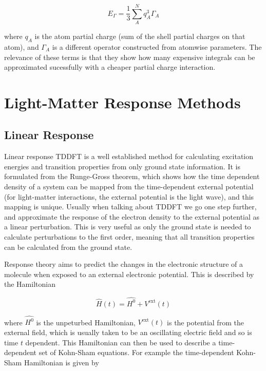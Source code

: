 \begin{equation}
E_\Gamma = \frac{1}{3}\sum_A^N q_A^3 \Gamma_A
\end{equation}

where $q_A$ is the atom partial charge (sum of the shell partial charges on that atom), 
and $\Gamma_A$ is a different operator constructed from atomwise parameters. The relevance 
of these terms is that they show how many expensive integrals can be approximated 
sucessfully with a cheaper partial charge interaction.

\section{Light-Matter Response Methods}
\label{sec:response_theories}

\subsection{Linear Response}
\label{subsec:tddft}

Linear response TDDFT is a well established method for calculating excitation energies
and transition properties from only ground state information. It is formulated 
from the Runge-Gross theorem\cite{Runge1984}, which shows how the time dependent 
density of a system can be mapped from the time-dependent external potential (for 
light-matter interactions, the external potential is the light wave), and this 
mapping is unique. Usually when talking about TDDFT we go one step further, and 
approximate the response of the electron density to the external potential as a 
linear perturbation\cite{Marques2004}. This is very useful as only the ground state
is needed to calculate perturbations to the first order, meaning that all transition
properties can be calculated from the ground state\cite{Marques2004}.

Response theory aims to predict the changes in the electronic structure of a molecule 
when exposed to an external electronic potential. This is described by the Hamiltonian

\begin{equation}
\hat{H}\left(t\right) = \hat{H^0} + V^{\text{ext}}\left(t\right)
\end{equation}

where $\hat{H^0}$ is the unpeturbed Hamiltonian, $V^{\text{ext}}\left(t\right)$ 
is the potential from the external field, which is usually taken to be an oscillating 
electric field and so is time $t$ dependent. This Hamiltonian can then be used to 
describe a time-dependent set of Kohn-Sham equations\cite{Kohn1952}. For example 
the time-dependent Kohn-Sham Hamiltonian is given by

